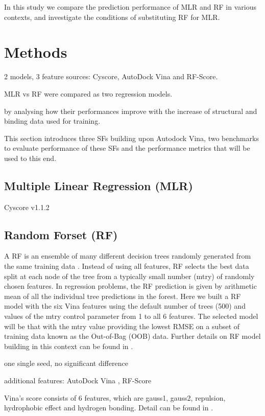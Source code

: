 \documentclass[journal=jacsat,manuscript=article]{achemso}
\begin{document}
In this study we compare the prediction performance of MLR and RF in various contexts, and investigate the conditions of substituting RF for MLR.

\section{Methods}

2 models, 3 feature sources: Cyscore, AutoDock Vina and RF-Score.

MLR vs RF were compared as two regression models.

by analysing how their performances improve with the increase of structural and binding data used for training.

This section introduces three SFs building upon Autodock Vina, two benchmarks to evaluate performance of these SFs and the performance metrics that will be used to this end.

\subsection{Multiple Linear Regression (MLR)}

Cyscore v1.1.2

\subsection{Random Forset (RF)}

A RF is an ensemble of many different decision trees randomly generated from the same training data \cite{1309}. Instead of using all features, RF selects the best data split at each node of the tree from a typically small number (mtry) of randomly chosen features. In regression problems, the RF prediction is given by arithmetic mean of all the individual tree predictions in the forest. Here we built a RF model with the six Vina features using the default number of trees (500) and values of the mtry control parameter from 1 to all 6 features. The selected model will be that with the mtry value providing the lowest RMSE on a subset of training data known as the Out-of-Bag (OOB) data. Further details on RF model building in this context can be found in \cite{564}.

one single seed, no significant difference

additional features: AutoDock Vina \cite{595}, RF-Score \cite{564}

Vina’s score consists of 6 features, which are gauss1, gauss2, repulsion, hydrophobic effect and hydrogen bonding. Detail can be found in \cite{1362}.
\end{document}
